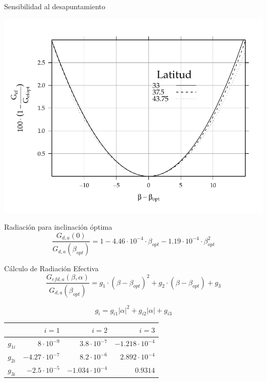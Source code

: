 \documentclass[xcolor={usenames,svgnames,dvipsnames}]{beamer}
\begin{document}
\begin{frame}[label={sec:orgc4410b9}]{Sensibilidad al desapuntamiento}
\begin{center}
\includegraphics[width=.9\linewidth]{../figs/PerdidasInclinacionOptima.pdf}
\end{center}
\end{frame}

\begin{frame}[label={sec:orga97ff04}]{Radiación para inclinación óptima}
\[\frac{G_{d,a}(0)}{G_{d,a}(\beta_{opt})}=1-4.46\cdot10^{-4}\cdot\beta_{opt}-1.19\cdot10^{-4}\cdot\beta_{opt}^{2}\]
\end{frame}

\begin{frame}[label={sec:org681b107}]{Cálculo de Radiación Efectiva}
\[
\frac{G_{efd,a}(\beta,\alpha)}{G_{d,a}(\beta_{opt})} = g_{1}\cdot(\beta-\beta_{opt})^{2}+g_{2}\cdot(\beta-\beta_{opt})+g_{3}
\]

\[
g_{i} = g_{i1}|\alpha|^{2}+g_{i2}|\alpha|+g_{i3}
\]

\begin{center}
\begin{tabular}{lrrr}
 & \(i=1\) & \(i=2\) & \(i=3\)\\
\hline
\(g_{1i}\) & \(8\cdot10^{-9}\) & \(3.8\cdot10^{-7}\) & \(-1.218\cdot10^{-4}\)\\
\(g_{2i}\) & \(-4.27\cdot10^{-7}\) & \(8.2\cdot10^{-6}\) & \(2.892\cdot10^{-4}\)\\
\(g_{3i}\) & \(-2.5\cdot10^{-5}\) & \(-1.034\cdot10^{-4}\) & \(0.9314\)\\
\end{tabular}
\end{center}
\end{frame}
\end{document}
